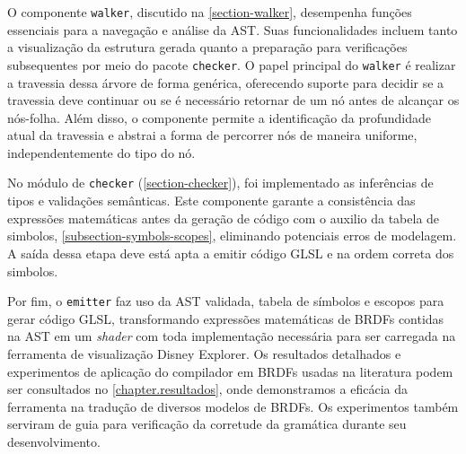O componente \texttt{walker}, discutido na \autoref{section-walker}, desempenha funções essenciais para a navegação e análise da AST. Suas funcionalidades incluem tanto a visualização da estrutura gerada quanto a preparação para verificações subsequentes por meio do pacote \texttt{checker}. O papel principal do \texttt{walker} é realizar a travessia dessa árvore de forma genérica, oferecendo suporte para decidir se a travessia deve continuar ou se é necessário retornar de um nó antes de alcançar os nós-folha. Além disso, o componente permite a identificação da profundidade atual da travessia e abstrai a forma de percorrer nós de maneira uniforme, independentemente do tipo do nó.

No módulo de \texttt{checker} (\autoref{section-checker}), foi implementado as  inferências de tipos e validações semânticas. Este componente garante a consistência das expressões matemáticas antes da geração de código com o auxilio da tabela de simbolos, \autoref{subsection-symbols-scopes}, eliminando potenciais erros de modelagem. A saída dessa etapa deve está apta a emitir código GLSL e na ordem correta dos simbolos.

Por fim, o \texttt{emitter} faz uso da AST validada, tabela de símbolos e escopos para gerar código GLSL, transformando expressões matemáticas de BRDFs contidas na AST em um \textit{shader} com toda implementação necessária para ser carregada na ferramenta de visualização Disney Explorer. Os resultados detalhados e experimentos de aplicação do compilador em BRDFs usadas na literatura podem ser consultados no \autoref{chapter.resultados}, onde demonstramos a eficácia da ferramenta na tradução de diversos modelos de BRDFs. Os experimentos também serviram de guia para verificação da corretude da gramática durante seu desenvolvimento.


